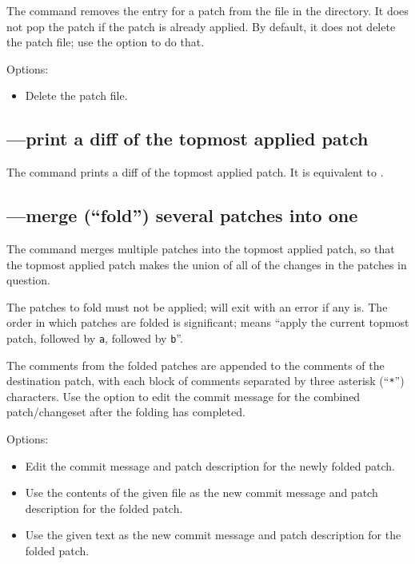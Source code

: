 The  command removes the entry for a patch from the
 file in the  directory.  It
does not pop the patch if the patch is already applied.  By default,
it does not delete the patch file; use the  option to
do that.

Options:
\begin{itemize}
\item[\hgopt{qdel}{-f}] Delete the patch file.
\end{itemize}

\subsection{---print a diff of the topmost applied patch}

The  command prints a diff of the topmost applied patch.
It is equivalent to .

\subsection{---merge (``fold'') several patches into one}

The  command merges multiple patches into the topmost
applied patch, so that the topmost applied patch makes the union of
all of the changes in the patches in question.

The patches to fold must not be applied;  will exit with
an error if any is.  The order in which patches are folded is
significant;  means ``apply the current topmost
patch, followed by \texttt{a}, followed by \texttt{b}''.

The comments from the folded patches are appended to the comments of
the destination patch, with each block of comments separated by three
asterisk (``\texttt{*}'') characters.  Use the 
option to edit the commit message for the combined patch/changeset
after the folding has completed.

Options:
\begin{itemize}
\item[\hgopt{qfold}{-e}] Edit the commit message and patch description
  for the newly folded patch.
\item[\hgopt{qfold}{-l}] Use the contents of the given file as the new
  commit message and patch description for the folded patch.
\item[\hgopt{qfold}{-m}] Use the given text as the new commit message
  and patch description for the folded patch.
\end{itemize}


